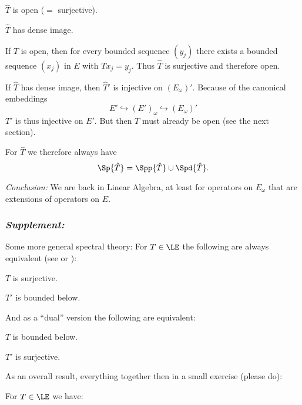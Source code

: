 \documentclass[%
	,english 
	,headings	= small 
	,leqno
	,parskip		= half+
	,DIV			= 14
	,BCOR 			= 10mm	
		]{scrartcl}
\begin{document}
\begin{multicols}{2}
\begin{proposition}
\begin{myequivalent}
	\item
	$ \hat{ T } $ is open ($ = $ surjective).
	
	\item
	$ \hat{ T } $ has dense image.
\end{myequivalent}
\end{proposition}
%
If $ T $ is open, then for every bounded sequence $ ( y_{ j } ) $ there exists a bounded sequence $ ( x_{ j } ) $ in $ E $ with $ T x_{ j } = y_{ j } $.
Thus $ \hat{ T } $ is surjective and therefore open.

If $ \hat{ T } $ has dense image, then $ \hat{ T }' $ is injective on $ ( E_{ \omega } ){}' $.
Because of the canonical embeddings
%
\[
    E' \hookrightarrow ( E' )_{ \omega } \hookrightarrow ( E_{ \omega } ){}'
\]
%
$ T' $ is thus injective on $ E' $.
But then $ T $ must already be open (see the next section).
%
\begin{corollary}
For $ \hat{ T } $ we therefore always have 
%
\[
    \Sp{ \hat{ T } } = \Spp{ \hat{ T } } \cup \Spd{ \hat{ T } }  . 
\]
%
\end{corollary}
%
\emph{Conclusion: } We are back in Linear Algebra, at least for operators on $ E_{ \omega } $ that are extensions of operators on $ E $.
%
\subsubsection{\emph{Supplement: }}
Some more general spectral theory: For $ T \in \LE $ the following are always equivalent (see \textcite[Theorem 57.16 \& 57.18]{berberian:1973} or \textcite[Chap. 2, Theorem 51 \& Theorem 52]{mathieu:1998}):
%
\begin{myequivalent}
	\item
	$ T $ is surjective.
	
	\item
	$ T' $ is bounded below.
\end{myequivalent}
%
And as a \enquote{dual} version the following are equivalent:
%
\begin{myequivalent}
	\item
	$ T $ is bounded below.
	
	\item
	$ T' $ is surjective.
\end{myequivalent} 
%
As an overall result, everything together then in a small exercise (please do):
%
\begin{exercise}
For $ T \in \LE $ we have:
%
\begin{myenumerate}


\end{myenumerate}
\end{exercise}
\end{multicols}
\end{document}
